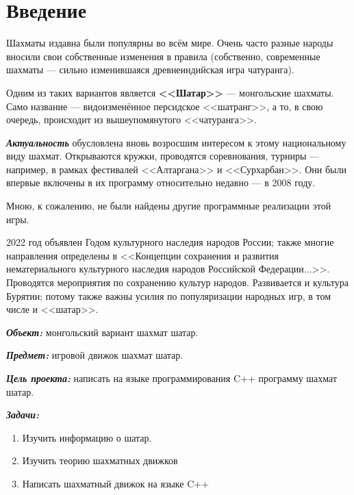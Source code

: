 {
	\chapter*{Введение}
	Шахматы издавна были популярны во всём мире. Очень часто разные народы вносили свои собственные изменения в правила (собственно, современные шахматы --- сильно изменившаяся древнеиндийская игра чатуранга). 
	
	Одним из таких вариантов является \textbf{<<Шатар>>} --- монгольские шахматы. Само название --- видоизменённое персидское <<шатранг>>, а то, в свою очередь, происходит из вышеупомянутого <<чатуранга>>.
	
	\textbf{\textit{Актуальность}} обусловлена вновь возросшим интересом к этому национальному виду шахмат. Открываются кружки, проводятся соревнования, турниры --- например, в рамках фестивалей <<Алтаргана>> и <<Сурхарбан>>. Они были впервые включены в их программу относительно недавно --- в 2008 году.
	
	Мною, к сожалению, не были найдены другие программные реализации этой игры.
	
	2022 год  объявлен Годом культурного наследия народов России; также многие направления определены в <<Концепции сохранения и развития нематериального культурного наследия народов Российской Федерации...>>. Проводятся мероприятия по сохранению культур народов. Развивается и культура Бурятии; потому  также важны  усилия по популяризации народных игр, в том числе и <<шатар>>.
	
	\textbf{\textit{Объект:}} монгольский вариант шахмат шатар.
	
	\textbf{\textit{Предмет:}} игровой движок шахмат шатар.
	
	\textbf{\textit{Цель проекта:}} написать на языке программирования C++ программу шахмат шатар.
	
	\textbf{\textit{Задачи:}}
	
	\begin{enumerate}
		\item Изучить информацию о шатар.
		\item Изучить теорию шахматных движков
		\item Написать шахматный движок на языке C++
	\end{enumerate}
	\clearpage
}
